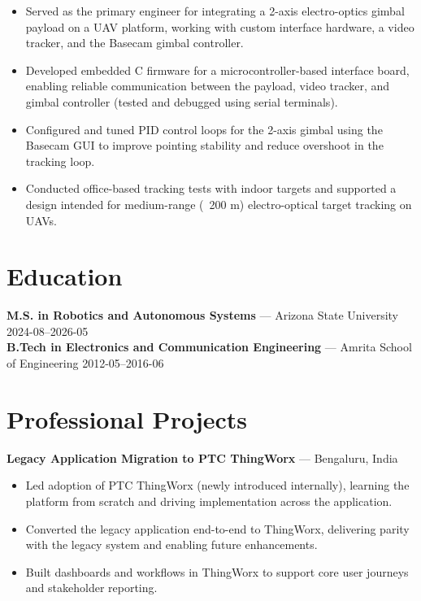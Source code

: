 \documentclass[11pt]{article}
\begin{document}
\begin{itemize}[leftmargin=*,noitemsep]
  
  \item Served as the primary engineer for integrating a 2-axis electro-optics gimbal payload on a UAV platform, working with custom interface hardware, a video tracker, and the Basecam gimbal controller.
  
  \item Developed embedded C firmware for a microcontroller-based interface board, enabling reliable communication between the payload, video tracker, and gimbal controller (tested and debugged using serial terminals).
  
  \item Configured and tuned PID control loops for the 2-axis gimbal using the Basecam GUI to improve pointing stability and reduce overshoot in the tracking loop.
  
  \item Conducted office-based tracking tests with indoor targets and supported a design intended for medium-range (~200 m) electro-optical target tracking on UAVs.
  
\end{itemize}

\vspace{4pt}


\section*{Education}

\textbf{ M.S. in Robotics and Autonomous Systems } --- Arizona State University \hfill 2024-08--2026-05\\

\textbf{ B.Tech in Electronics and Communication Engineering } --- Amrita School of Engineering \hfill 2012-05--2016-06\\




\section*{ Professional Projects }

\textbf{ Legacy Application Migration to PTC ThingWorx } --- Bengaluru, India\\

\begin{itemize}[leftmargin=*,noitemsep]
  
  \item Led adoption of PTC ThingWorx (newly introduced internally), learning the platform from scratch and driving implementation across the application.
  
  \item Converted the legacy application end-to-end to ThingWorx, delivering parity with the legacy system and enabling future enhancements.
  
  \item Built dashboards and workflows in ThingWorx to support core user journeys and stakeholder reporting.
  
\end{itemize}
\end{document}
